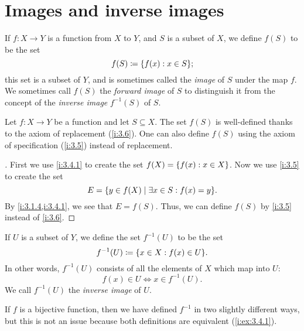 \section{Images and inverse images}\label{i:sec:3.4}

\begin{defn}\label{i:3.4.1}
  If \(f : X \to Y\) is a function from \(X\) to \(Y\), and \(S\) is a subset of \(X\), we define \(f(S)\) to be the set
  \[
    f(S) \coloneqq \set{f(x) : x \in S};
  \]
  this set is a subset of \(Y\), and is sometimes called the \emph{image} of \(S\) under the map \(f\).
  We sometimes call \(f(S)\) the \emph{forward image} of \(S\) to distinguish it from the concept of the \emph{inverse image} \(f^{-1}(S)\) of \(S\).
\end{defn}

\begin{ac}\label{i:ac:3.4.1}
  Let \(f : X \to Y\) be a function and let \(S \subseteq X\).
  The set \(f(S)\) is well-defined thanks to the axiom of replacement (\cref{i:3.6}).
  One can also define \(f(S)\) using the axiom of specification (\cref{i:3.5}) instead of replacement.
\end{ac}

\begin{proof}[]
  First we use \cref{i:3.4.1} to create the set \(f(X) = \left\lbrace f(x) : x \in X\right\rbrace\).
  Now we use \cref{i:3.5} to create the set
  \[
    E = \set{y \in f(X) \mid \exists x \in S : f(x) = y}.
  \]
  By \cref{i:3.1.4,i:3.4.1}, we see that \(E = f(S)\).
  Thus, we can define \(f(S)\) by \cref{i:3.5} instead of \cref{i:3.6}.
\end{proof}

\setcounter{thm}{3}
\begin{defn}\label{i:3.4.4}
  If \(U\) is a subset of \(Y\), we define the set \(f^{-1}(U)\) to be the set
  \[
    f^{-1}(U) \coloneqq \set{x \in X : f(x) \in U}.
  \]
  In other words, \(f^{-1}(U)\) consists of all the elements of \(X\) which map into \(U\):
  \[
    f(x) \in U \iff x \in f^{-1}(U).
  \]
  We call \(f^{-1}(U)\) the \emph{inverse image} of \(U\).
\end{defn}

\setcounter{thm}{6}
\begin{rmk}\label{i:3.4.6}
  If \(f\) is a bijective function, then we have defined \(f^{-1}\) in two slightly different ways, but this is not an issue because both definitions are equivalent (\cref{i:ex:3.4.1}).
\end{rmk}

